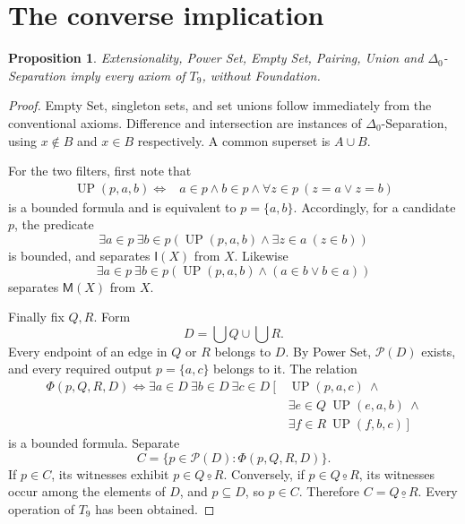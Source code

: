 \documentclass[11pt,a4paper]{article}
\numberwithin{equation}{section}
\newtheorem{proposition}[theorem]{Proposition}
\newcommand{\up}[2]{\{#1,#2\}}
\newcommand{\Comp}{\mathbin{\underline{\circ}}}
\newcommand{\Int}{\mathsf{I}}
\newcommand{\Mem}{\mathsf{M}}
\newcommand{\Pow}{\mathcal P}
\newcommand{\Dzero}{\Delta_0}
\newcommand{\Tnine}{T_9}
\begin{document}
\section{The converse implication}\label{sec:converse}
\begin{proposition}\label{prop:reverse}
Extensionality, Power Set, Empty Set, Pairing, Union and $\Dzero$-Separation imply every axiom of $\Tnine$, without Foundation.
\end{proposition}
\begin{proof}
Empty Set, singleton sets, and set unions follow immediately from the conventional axioms.  Difference and intersection are instances of $\Dzero$-Separation, using $x\notin B$ and $x\in B$ respectively.  A common superset is $A\cup B$.

For the two filters, first note that
\begin{equation}\label{eq:pair-bounded}
\begin{split}
\operatorname{UP}(p,a,b)\iff{}&a\in p\land b\in p\land
\forall z\in p\ (z=a\lor z=b)
\end{split}
\end{equation}
is a bounded formula and is equivalent to $p=\up ab$.  Accordingly, for a candidate $p$, the predicate
\[
\exists a\in p\ \exists b\in p\left(
\operatorname{UP}(p,a,b)\land
\exists z\in a\ (z\in b)\right)
\]
is bounded, and separates $\Int(X)$ from $X$.  Likewise
\[
\exists a\in p\ \exists b\in p\left(
\operatorname{UP}(p,a,b)\land(a\in b\lor b\in a)\right)
\]
separates $\Mem(X)$ from $X$.

Finally fix $Q,R$.  Form
\[
D=\bigcup Q\cup\bigcup R.
\]
Every endpoint of an edge in $Q$ or $R$ belongs to $D$.  By Power Set, $\Pow(D)$ exists, and every required output $p=\up ac$ belongs to it.  The relation
\begin{equation}\label{eq:comp-bounded}
\begin{aligned}
\Phi(p,Q,R,D)\iff \exists a\in D\ \exists b\in D\ \exists c\in D\ [\,
&\operatorname{UP}(p,a,c)\ \land\\
&\exists e\in Q\ \operatorname{UP}(e,a,b)\ \land\\
&\exists f\in R\ \operatorname{UP}(f,b,c)\,]
\end{aligned}
\end{equation}
is a bounded formula.  Separate
\[
C=\{p\in\Pow(D):\Phi(p,Q,R,D)\}.
\]
If $p\in C$, its witnesses exhibit $p\in Q\Comp R$.  Conversely, if $p\in Q\Comp R$, its witnesses occur among the elements of $D$, and $p\subseteq D$, so $p\in C$.  Therefore $C=Q\Comp R$.  Every operation of $\Tnine$ has been obtained.
\end{proof}
\end{document}
